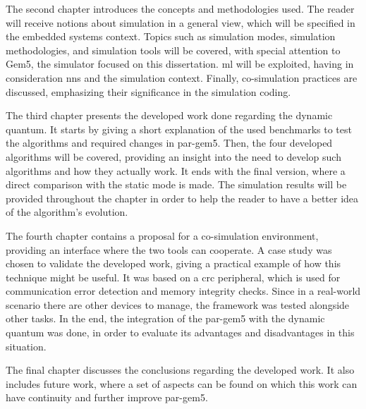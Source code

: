The second chapter introduces the concepts and methodologies used. The reader will receive notions about simulation in a general view, which 
will be specified in the embedded systems context. Topics such as simulation modes, simulation methodologies, and simulation tools 
will be covered, with special attention to Gem5, the simulator focused on this dissertation. \gls{ml} will be exploited, having in 
consideration \glspl{nn} and the simulation context. Finally, co-simulation practices are discussed, emphasizing their significance in the 
simulation coding.

The third chapter presents the developed work done regarding the dynamic quantum. It starts by giving a short explanation of the used benchmarks
to test the algorithms and required changes in par-gem5. Then, the four developed algorithms will be covered, providing an insight into the need to develop 
such algorithms and how they actually work. It ends with the final version, where a direct comparison with the static mode is made. The 
simulation results will be provided throughout the chapter in order to help the reader to have a better idea of the algorithm's evolution.

The fourth chapter contains a proposal for a co-simulation environment, providing an interface where the two tools can cooperate. 
A case study was chosen to validate the developed work, giving a practical example of how this technique might be useful. 
It was based on a \gls{crc} peripheral, which is used for communication error detection and memory integrity checks. 
Since in a real-world scenario there are other devices to manage, the framework was tested alongside other tasks. In the end, the integration
of the par-gem5 with the dynamic quantum was done, in order to evaluate its advantages and disadvantages in this situation. 

The final chapter discusses the conclusions regarding the developed work. It also includes future work, where a set of aspects can be found on 
which this work can have continuity and further improve par-gem5. 

